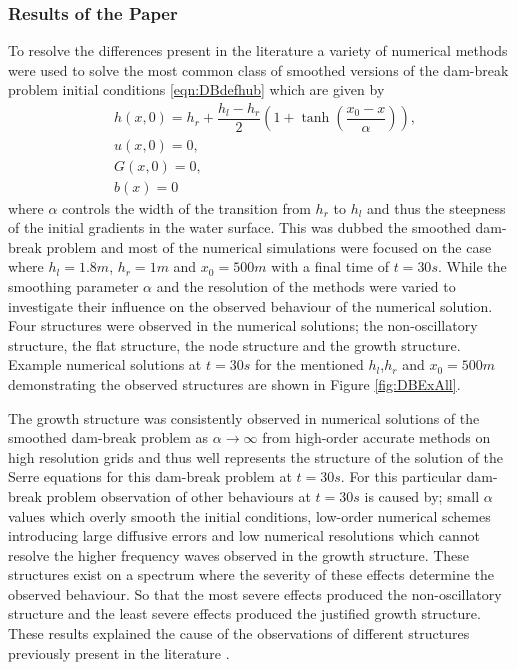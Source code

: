 \subsubsection{Results of the Paper}
To resolve the differences present in the literature a variety of numerical methods were used to solve the most common class of smoothed versions of the dam-break problem initial conditions \eqref{eqn:DBdefhub} which are given by
\begin{subequations}
	\begin{align}
	&h(x,0) = h_r + \dfrac{h_l - h_r}{2} \left(1 +  \tanh\left(\dfrac{x_0 - x}{\alpha}\right) \right), \\
	&u(x,0) = 0 , \\
	&G(x,0) = 0 , \\
	&b(x) = 0
	\end{align}
	\label{eqn:SDBdefhub}
\end{subequations} 
where $\alpha$ controls the width of the transition from $h_r$ to $h_l$ and thus the steepness of the initial gradients in the water surface. This was dubbed the smoothed dam-break problem and most of the numerical simulations were focused on the case where $h_l = 1.8m$, $h_r = 1m$ and $x_0 = 500m$ with a final time of $t=30s$. While the smoothing parameter $\alpha$ and the resolution of the methods were varied to investigate their influence on the observed behaviour of the numerical solution. Four structures were observed in the numerical solutions; the non-oscillatory structure, the flat structure, the node structure and the growth structure. Example numerical solutions at $t=30s$ for the mentioned $h_l$,$h_r$ and $x_0 = 500m$  demonstrating the observed structures are shown in Figure \ref{fig:DBExAll}. 

The growth structure was consistently observed in numerical solutions of the smoothed dam-break problem as $\alpha \rightarrow \infty$ from high-order accurate methods on high resolution grids and thus well represents the structure of the solution of the Serre equations for this dam-break problem at $t=30s$. For this particular dam-break problem observation of other behaviours at $t=30s$ is caused by; small $\alpha$ values which overly smooth the initial conditions, low-order numerical schemes introducing large diffusive errors and low numerical resolutions which cannot resolve the higher frequency waves observed in the growth structure. These structures exist on a spectrum  where the severity of these effects determine the observed behaviour. So that the most severe effects produced the non-oscillatory structure and the least severe effects produced the justified growth structure. These results explained the cause of the observations of different structures previously present in the literature \cite{El-etal-2006,Hank-etal-2010-2034,Mitsotakis-etal-2014,Mitsotakis-etal-2017,doCarmo-etal-2018-404}. 

